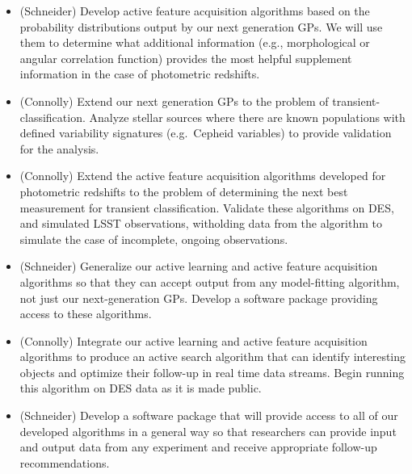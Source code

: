 \documentclass[prd,nofootbib,floatfix,11pt,tightenlines]{revtex4}
\begin{document}
\vspace{.5\baselineskip}
\begin{itemize}

\item (Schneider)
Develop active feature acquisition algorithms based on the probability distributions
output by our next generation GPs.  We will use them to determine what additional
information (e.g., morphological or angular correlation function) provides the most
helpful supplement information in the case of photometric redshifts.

\item (Connolly) Extend our next generation GPs to the problem of 
transient-classification.  Analyze stellar
 sources where there are known populations with defined variability
 signatures (e.g.\ Cepheid variables) to provide validation for the
 analysis.

\item (Connolly) Extend the active feature acquisition algorithms developed for photometric
redshifts to the problem of determining the next best measurement for transient
classification.
Validate these algorithms on DES, and simulated LSST observations, witholding
data from the algorithm to simulate the case of incomplete, ongoing observations.

\item (Schneider) 
Generalize our active learning and active feature acquisition algorithms so that
they can accept output from any model-fitting algorithm, not just our next-generation
GPs.  Develop a software package providing access to these algorithms.

\end{itemize}
\vspace{.5\baselineskip}

 \vspace{.5\baselineskip}

\begin{itemize}

\item (Connolly)
Integrate our active learning and active feature acquisition algorithms to
produce an active search algorithm that can identify interesting objects and optimize
their follow-up in real time data streams.  Begin running this algorithm on DES data
as it is made public.

\item (Schneider) Develop a software package that will provide access to all of our
developed algorithms in a general way so that researchers can provide input and output
data from any experiment and receive appropriate follow-up recommendations.

\end{itemize}
\end{document}
